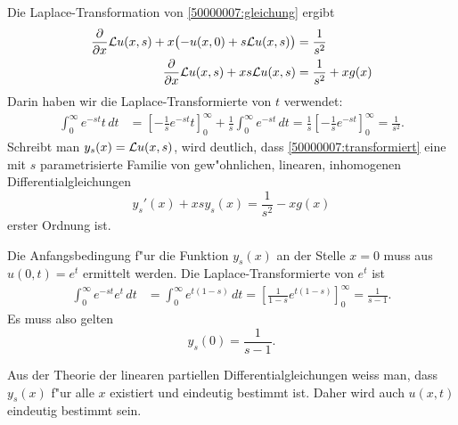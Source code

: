\begin{loesung}
\begin{teilaufgaben}
\item
Die Laplace-Transformation von \eqref{50000007:gleichung} ergibt
\begin{align}
\frac{\partial}{\partial x}{\cal L}u(x,s)
+x\bigl(-u(x,0)+s{\cal L}u(x,s)\bigr)&=\frac1{s^2}
\notag
\\
\frac{\partial}{\partial x}{\cal L}u(x,s)
+xs{\cal L}u(x,s)&=\frac1{s^2}+xg(x)
\label{50000007:transformiert}
\end{align}
Darin haben wir die Laplace-Transformierte von $t$ verwendet:
\begin{align*}
\int_0^\infty e^{-st}t\,dt
&=
\left[
-\frac1{s} e^{-st}t
\right]_0^\infty
+\frac1s\int_0^\infty e^{-st}\,dt
=\frac1s\left[
-\frac1se^{-st}
\right]_0^\infty=\frac1{s^2}.
\end{align*}
Schreibt man $y_s(x)={\cal L}u(x,s)$, wird deutlich,
dass \eqref{50000007:transformiert} eine mit $s$ parametrisierte
Familie von gew"ohnlichen, linearen, inhomogenen Differentialgleichungen
\begin{equation}
y_s'(x)+xsy_s(x)=\frac1{s^2}-xg(x)
\label{50000007:family}
\end{equation}
erster Ordnung ist.

Die Anfangsbedingung f"ur die Funktion $y_s(x)$ an der Stelle $x=0$
muss aus $u(0,t)=e^t$ ermittelt werden.
Die Laplace-Transformierte von $e^t$ ist
\begin{align*}
\int_0^\infty e^{-st}e^t\,dt
&=
\int_0^\infty e^{t(1-s)}\,dt
=\left[\frac1{1-s}e^{t(1-s)}\right]_0^\infty=\frac1{s-1}.
\end{align*}
Es muss also gelten
\[
y_s(0)=\frac1{s-1}.
\]
\item
Aus der Theorie der linearen partiellen Differentialgleichungen weiss man,
dass $y_s(x)$ f"ur alle $x$ existiert und eindeutig bestimmt ist. 
Daher wird auch $u(x,t)$ eindeutig bestimmt sein.


\end{teilaufgaben}
\end{loesung}
